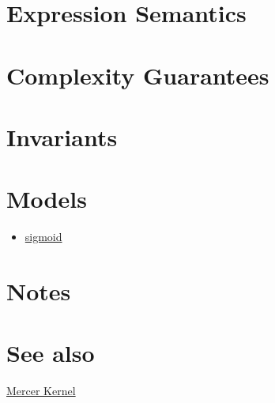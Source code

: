 \documentclass{article}
\begin{document}
\section*{Expression Semantics}

\section*{Complexity Guarantees}

\section*{Invariants}

\section*{Models}
\begin{itemize}
\item \href{\kmlroot/reference/sigmoid.html}{sigmoid}
\end{itemize}

\section*{Notes}

\section*{See also}
\href{\kmlroot/reference/mercer_kernel.html}{Mercer Kernel}




\end{document}
